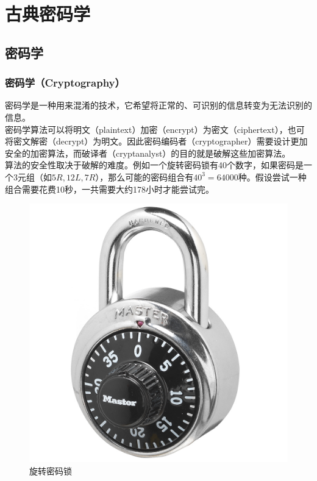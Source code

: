 \chapter{古典密码学}

\section{密码学}

\subsection{密码学（Cryptography）}

密码学是一种用来混淆的技术，它希望将正常的、可识别的信息转变为无法识别的信息。\\

密码学算法可以将明文（plaintext）加密（encrypt）为密文（ciphertext），也可将密文解密（decrypt）为明文。因此密码编码者（cryptographer）需要设计更加安全的加密算法，而破译者（cryptanalyst）的目的就是破解这些加密算法。\\

算法的安全性取决于破解的难度。例如一个旋转密码锁有40个数字，如果密码是一个3元组（如$ 5R, 12L, 7R $），那么可能的密码组合有$ 40^3 = 64000 $种。假设尝试一种组合需要花费10秒，一共需要大约178小时才能尝试完。\\

\begin{figure}[H]
    \centering
    \includegraphics[scale=0.6]{img/C1/1-1/1.png}
    \caption{旋转密码锁}
\end{figure}

